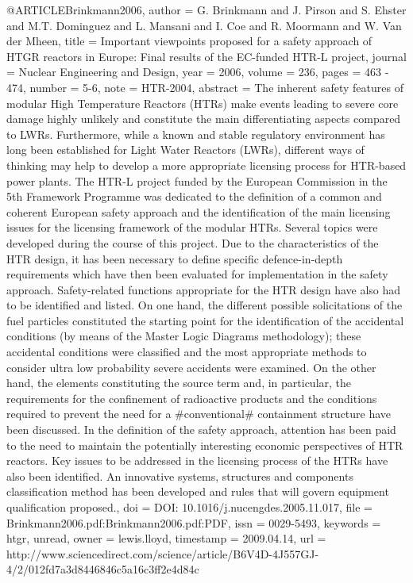 @ARTICLE{Brinkmann2006,
  author = {G. Brinkmann and J. Pirson and S. Ehster and M.T. Dominguez and L.
	Mansani and I. Coe and R. Moormann and W. Van der Mheen},
  title = {Important viewpoints proposed for a safety approach of HTGR reactors
	in Europe: Final results of the EC-funded HTR-L project},
  journal = {Nuclear Engineering and Design},
  year = {2006},
  volume = {236},
  pages = {463 - 474},
  number = {5-6},
  note = {HTR-2004},
  abstract = {The inherent safety features of modular High Temperature Reactors
	(HTRs) make events leading to severe core damage highly unlikely
	and constitute the main differentiating aspects compared to LWRs.
	Furthermore, while a known and stable regulatory environment has
	long been established for Light Water Reactors (LWRs), different
	ways of thinking may help to develop a more appropriate licensing
	process for HTR-based power plants. The HTR-L project funded by the
	European Commission in the 5th Framework Programme was dedicated
	to the definition of a common and coherent European safety approach
	and the identification of the main licensing issues for the licensing
	framework of the modular HTRs. Several topics were developed during
	the course of this project. Due to the characteristics of the HTR
	design, it has been necessary to define specific defence-in-depth
	requirements which have then been evaluated for implementation in
	the safety approach. Safety-related functions appropriate for the
	HTR design have also had to be identified and listed. On one hand,
	the different possible solicitations of the fuel particles constituted
	the starting point for the identification of the accidental conditions
	(by means of the Master Logic Diagrams methodology); these accidental
	conditions were classified and the most appropriate methods to consider
	ultra low probability severe accidents were examined. On the other
	hand, the elements constituting the source term and, in particular,
	the requirements for the confinement of radioactive products and
	the conditions required to prevent the need for a #conventional#
	containment structure have been discussed. In the definition of the
	safety approach, attention has been paid to the need to maintain
	the potentially interesting economic perspectives of HTR reactors.
	Key issues to be addressed in the licensing process of the HTRs have
	also been identified. An innovative systems, structures and components
	classification method has been developed and rules that will govern
	equipment qualification proposed.},
  doi = {DOI: 10.1016/j.nucengdes.2005.11.017},
  file = {Brinkmann2006.pdf:Brinkmann2006.pdf:PDF},
  issn = {0029-5493},
  keywords = {htgr, unread},
  owner = {lewis.lloyd},
  timestamp = {2009.04.14},
  url = {http://www.sciencedirect.com/science/article/B6V4D-4J557GJ-4/2/012fd7a3d8446846c5a16c3ff2e4d84c}
}

